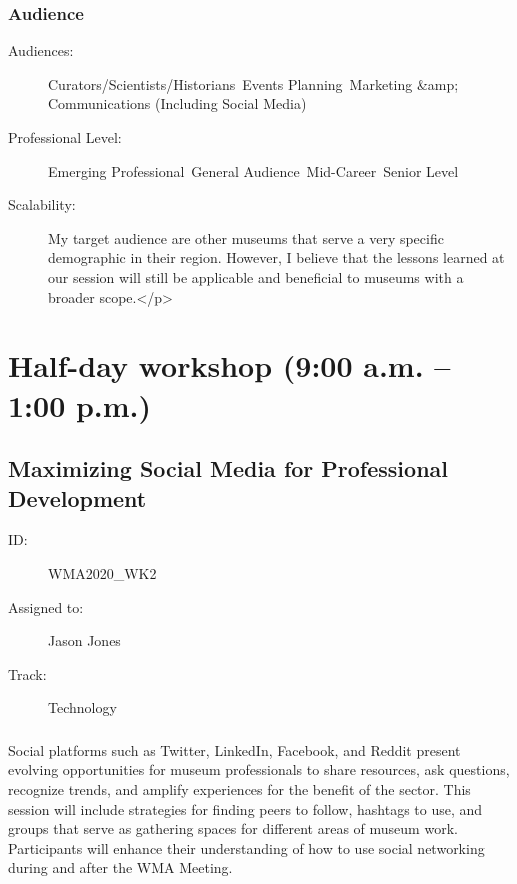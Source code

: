 \documentclass{report}
\begin{document}
              \subsection*{Audience}
                \begin{description}
                  \item [Audiences:]Curators/Scientists/Historians~Events Planning~Marketing &amp; Communications (Including Social Media)~
                  \item[Professional Level:]Emerging Professional~General Audience~Mid-Career~Senior Level~
                \item[Scalability:] My target audience are other museums that serve a very specific demographic in their region. However, I believe that the lessons learned at our session will still be applicable and beneficial to museums with a broader scope.</p>
							
              \end{description}




    
  

  
    \newpage
    \chapter*{ Half-day workshop (9:00 a.m. – 1:00 p.m.) }

      
        
          \newpage
          \section{  Maximizing Social Media for Professional Development }
            \begin{description}
              \item [ID:]
              WMA2020\_WK2

              \item [Assigned to:]Jason Jones~
                \item [Track:]Technology~
              \end{description}
              \subsection*{}
                Social platforms such as Twitter, LinkedIn, Facebook, and Reddit present evolving opportunities for museum professionals to share resources, ask questions, recognize trends, and amplify experiences for the benefit of the sector. This session will include strategies for finding peers to follow, hashtags to use, and groups that serve as gathering spaces for different areas of museum work. Participants will enhance their understanding of how to use social networking during and after the WMA Meeting.
\end{document}
